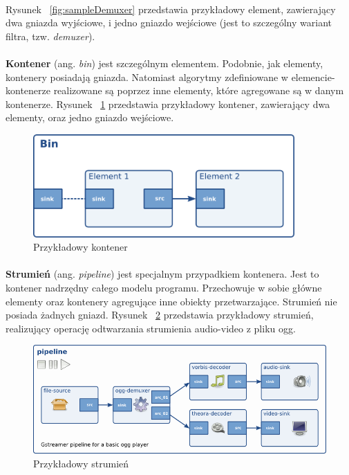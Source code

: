 \documentclass[12pt]{article}
\begin{document}
\paragraph{}
Rysunek ~\ref{fig:sampleDemuxer} przedstawia przykładowy element, zawierający dwa gniazda wyjściowe, i jedno gniazdo wejściowe (jest to szczególny wariant filtra, tzw. \textit{demuxer}).
\paragraph{}
\textbf{Kontener} (ang. \textit{bin}) jest szczególnym elementem. Podobnie, jak elementy, kontenery posiadają gniazda. Natomiast algorytmy zdefiniowane w elemencie-kontenerze realizowane są poprzez inne elementy, które agregowane są w danym kontenerze. Rysunek ~\ref{fig:sampleBin} przedstawia przykładowy kontener, zawierający dwa elementy, oraz jedno gniazdo wejściowe.
\begin{figure}[H]
  \includegraphics[width=100mm]{img/sample-bin.png}
  \caption{Przykładowy kontener \cite{gstmainpage}}
  \label{fig:sampleBin}
\end{figure}
\paragraph{}
\textbf{Strumień} (ang. \textit{pipeline}) jest specjalnym przypadkiem kontenera. Jest to kontener nadrzędny całego modelu programu. Przechowuje w sobie główne elementy oraz kontenery agregujące inne obiekty przetwarzające. Strumień nie posiada żadnych gniazd. Rysunek ~\ref{fig:samplePipeline} przedstawia przykładowy strumień, realizujący operację odtwarzania strumienia audio-video z pliku ogg.
\begin{figure}[H]
  \includegraphics[width=150mm]{img/simple-player.png}
  \caption{Przykładowy strumień \cite{gstmainpage}}
  \label{fig:samplePipeline}
\end{figure}
\end{document}

